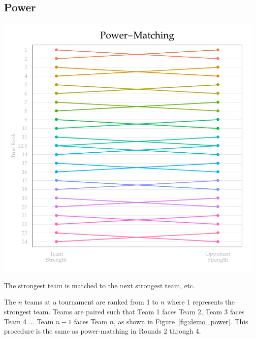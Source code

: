 \documentclass{tufte-handout}
\begin{document}
\subsection{Power}
\begin{marginfigure}[-10\baselineskip]%
  \includegraphics[width=\linewidth]{power-matching_demo.pdf}
  \caption{The strongest team is matched to the next strongest team, etc.}
  \label{fig:demo_power}
\end{marginfigure}

The $n$ teams at a tournament are ranked from 1 to $n$ where 1 represents the strongest team. Teams are paired such that Team 1 faces Team 2, Team 3 faces Team 4 ... Team $n-1$ faces Team $n$, as shown in Figure~\ref{fig:demo_power}. This procedure is the same as power-matching in Rounds 2 through 4.
\end{document}
